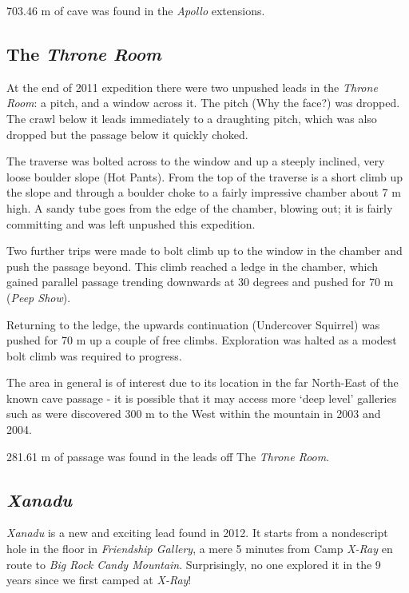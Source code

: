 703.46 m of cave was found in the \emph{Apollo} extensions.


\subsection{\texorpdfstring{The \emph{Throne
Room}}{The Throne Room}}

At the end of 2011 expedition there were two unpushed leads in the
\emph{Throne Room}: a pitch, and a window across it. The pitch (Why the
face?) was dropped. The crawl below it leads immediately to a draughting
pitch, which was also dropped but the passage below it quickly choked.

The traverse was bolted across to the window and up a steeply inclined,
very loose boulder slope (Hot Pants). From the top of the traverse is a
short climb up the slope and through a boulder choke to a fairly
impressive chamber about 7 m high. A sandy tube goes from the edge of
the chamber, blowing out; it is fairly committing and was left unpushed
this expedition.

Two further trips were made to bolt climb up to the window in the
chamber and push the passage beyond. This climb reached a ledge in the
chamber, which gained parallel passage trending downwards at 30 degrees
and pushed for 70 m (\emph{Peep Show}).

Returning to the ledge, the upwards continuation (Undercover Squirrel)
was pushed for 70 m up a couple of free climbs. Exploration was halted
as a modest bolt climb was required to progress.

The area in general is of interest due to its location in the far
North-East of the known cave passage - it is possible that it may access
more `deep level' galleries such as were discovered 300 m to the West
within the mountain in 2003 and 2004.

281.61 m of passage was found in the leads off The \emph{Throne Room}.


\subsection{\texorpdfstring{\emph{Xanadu}}{Xanadu}}

\emph{Xanadu} is a new and exciting lead found in 2012. It starts from a
nondescript hole in the floor in \emph{Friendship Gallery}, a mere 5
minutes from Camp \emph{X-Ray} en route to \emph{Big Rock Candy
Mountain}. Surprisingly, no one explored it in the 9 years since we
first camped at \emph{X-Ray}!

